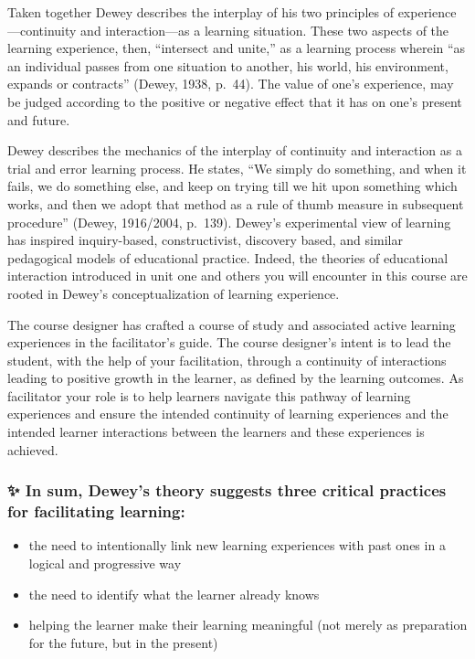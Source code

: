 \documentclass[
]{book}
\providecommand{\tightlist}{%
  \setlength{\itemsep}{0pt}\setlength{\parskip}{0pt}}
\begin{document}
Taken together Dewey describes the interplay of his two principles of experience---continuity and interaction---as a learning situation. These two aspects of the learning experience, then, ``intersect and unite,'' as a learning process wherein ``as an individual passes from one situation to another, his world, his environment, expands or contracts'' (Dewey, 1938, p.~44). The value of one's experience, may be judged according to the positive or negative effect that it has on one's present and future.

Dewey describes the mechanics of the interplay of continuity and interaction as a trial and error learning process. He states, ``We simply do something, and when it fails, we do something else, and keep on trying till we hit upon something which works, and then we adopt that method as a rule of thumb measure in subsequent procedure'' (Dewey, 1916/2004, p.~139). Dewey's experimental view of learning has inspired inquiry-based, constructivist, discovery based, and similar pedagogical models of educational practice. Indeed, the theories of educational interaction introduced in unit one and others you will encounter in this course are rooted in Dewey's conceptualization of learning experience.

The course designer has crafted a course of study and associated active learning experiences in the facilitator's guide. The course designer's intent is to lead the student, with the help of your facilitation, through a continuity of interactions leading to positive growth in the learner, as defined by the learning outcomes. As facilitator your role is to help learners navigate this pathway of learning experiences and ensure the intended continuity of learning experiences and the intended learner interactions between the learners and these experiences is achieved.

\begin{blank}
\hypertarget{in-sum-deweys-theory-suggests-three-critical-practices-for-facilitating-learning}{%
\subsubsection{✨ In sum, Dewey's theory suggests three critical practices for facilitating learning:}\label{in-sum-deweys-theory-suggests-three-critical-practices-for-facilitating-learning}}

\begin{itemize}
\tightlist
\item
  the need to intentionally link new learning experiences with past ones in a logical and progressive way\\
\item
  the need to identify what the learner already knows\\
\item
  helping the learner make their learning meaningful (not merely as preparation for the future, but in the present)
\end{itemize}
\end{blank}
\end{document}
